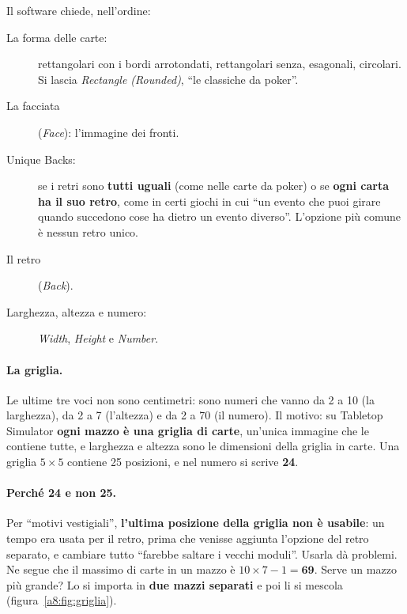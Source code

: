 Il software chiede, nell'ordine:
\begin{description}
  \item[La forma delle carte:] rettangolari con i bordi arrotondati, rettangolari
        senza, esagonali, circolari. Si lascia \emph{Rectangle (Rounded)}, ``le
        classiche da poker''.
  \item[La facciata] (\emph{Face}): l'immagine dei fronti.
  \item[Unique Backs:] se i retri sono \textbf{tutti uguali} (come nelle carte da
        poker) o se \textbf{ogni carta ha il suo retro}, come in certi giochi in cui
        ``un evento che puoi girare quando succedono cose ha dietro un evento
        diverso''. L'opzione più comune è nessun retro unico.
  \item[Il retro] (\emph{Back}).
  \item[Larghezza, altezza e numero:] \emph{Width}, \emph{Height} e \emph{Number}.
\end{description}

\paragraph{La griglia.} Le ultime tre voci non sono centimetri: sono numeri che vanno
da 2 a 10 (la larghezza), da 2 a 7 (l'altezza) e da 2 a 70 (il numero). Il motivo:
su Tabletop Simulator \textbf{ogni mazzo è una griglia di carte}, un'unica immagine
che le contiene tutte, e larghezza e altezza sono le dimensioni della griglia in
carte. Una griglia $5\times5$ contiene 25 posizioni, e nel numero si scrive
\textbf{24}.

\paragraph{Perché 24 e non 25.} Per ``motivi vestigiali'', \textbf{l'ultima posizione
della griglia non è usabile}: un tempo era usata per il retro, prima che venisse
aggiunta l'opzione del retro separato, e cambiare tutto ``farebbe saltare i vecchi
moduli''. Usarla dà problemi. Ne segue che il massimo di carte in un mazzo è
$10\times7-1 = \mathbf{69}$. Serve un mazzo più grande? Lo si importa in \textbf{due
mazzi separati} e poi li si mescola (figura~\ref{a8:fig:griglia}).

